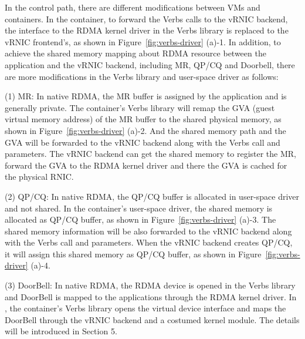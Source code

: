 In the control path, there are different modifications between VMs and containers. In the container, to forward the Verbs calls to the vRNIC backend, the interface to the RDMA kernel driver in the Verbs library is replaced to the vRNIC frontend's, as shown in Figure~\ref{fig:verbs-driver} (a)-1. In addition, to achieve the shared memory mapping about RDMA resource between the application and the vRNIC backend, including MR, QP/CQ and Doorbell, there are more modifications in the Verbs library and user-space driver as follows:

(1) MR: In native RDMA, the MR buffer is assigned by the application and is generally private. The container's Verbs library will remap the GVA (guest virtual memory address) of the MR buffer to the shared physical memory, as shown in Figure~\ref{fig:verbs-driver} (a)-2. And the shared memory path and the GVA will be forwarded to the vRNIC backend along with the Verbs call and parameters. The vRNIC backend can get the shared memory to register the MR, forward the GVA to the RDMA kernel driver and there the GVA is cached for the physical RNIC.

(2) QP/CQ: In native RDMA, the QP/CQ buffer is allocated in user-space driver and not shared. In the container's user-space driver, the shared memory is allocated as QP/CQ buffer, as shown in Figure~\ref{fig:verbs-driver} (a)-3. The shared memory information will be also forwarded to the vRNIC backend along with the Verbs call and parameters. When the vRNIC backend creates QP/CQ, it will assign this shared memory as QP/CQ buffer, as shown in Figure~\ref{fig:verbs-driver} (a)-4.


(3) DoorBell: In native RDMA, the RDMA device is opened in the Verbs library and DoorBell is mapped to the applications through the RDMA kernel driver. In \sys, the container's Verbs library opens the virtual device interface and maps the DoorBell through the vRNIC backend and a costumed kernel module. The details will be introduced in Section 5.


